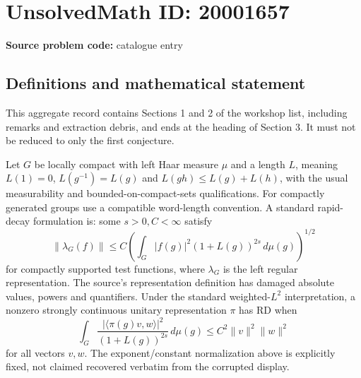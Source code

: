 \documentclass[11pt]{article}
\begin{document}
\section*{UnsolvedMath ID: 20001657}
\textbf{Source problem code:} catalogue entry
\subsection{Definitions and mathematical statement}
This aggregate record contains Sections 1 and 2 of the workshop list, including remarks and extraction debris, and ends at the heading of Section 3. It must not be reduced to only the first conjecture.

Let $G$ be locally compact with left Haar measure $\mu$ and a length $L$, meaning $L(1)=0$, $L(g^{-1})=L(g)$ and $L(gh)\leq L(g)+L(h)$, with the usual measurability and bounded-on-compact-sets qualifications. For compactly generated groups use a compatible word-length convention. A standard rapid-decay formulation is: some $s>0,C<\infty$ satisfy
\[
 \|\lambda_G(f)\|\leq C\left(\int_G|f(g)|^2(1+L(g))^{2s}\,d\mu(g)\right)^{1/2}
\]
for compactly supported test functions, where $\lambda_G$ is the left regular representation. The source's representation definition has damaged absolute values, powers and quantifiers. Under the standard weighted-$L^2$ interpretation, a nonzero strongly continuous unitary representation $\pi$ has RD when
\[
 \int_G\frac{|\langle\pi(g)v,w\rangle|^2}{(1+L(g))^{2s}}\,d\mu(g)
 \leq C^2\|v\|^2\|w\|^2
\]
for all vectors $v,w$. The exponent/constant normalization above is explicitly fixed, not claimed recovered verbatim from the corrupted display.
\end{document}
